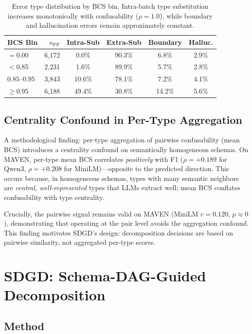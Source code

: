\documentclass[11pt,a4paper]{article}
\begin{document}
\begin{table}[t]
\centering
\small
\begin{tabular}{lrcccc}
\toprule
BCS Bin & $n_{\text{FP}}$ & Intra-Sub & Extra-Sub & Boundary & Halluc. \\
\midrule
$= 0.00$       & 6,172 &  0.0\% & 90.3\% & 6.8\% & 2.9\% \\
$< 0.85$       & 2,231 &  1.6\% & 89.9\% & 5.7\% & 2.8\% \\
$0.85$--$0.95$ & 3,843 & 10.6\% & 78.1\% & 7.2\% & 4.1\% \\
$\geq 0.95$    & 6,188 & 49.4\% & 30.8\% & 14.2\% & 5.6\% \\
\bottomrule
\end{tabular}
\caption{Error type distribution by BCS bin. Intra-batch type substitution increases monotonically with confusability ($\rho = 1.0$), while boundary and hallucination errors remain approximately constant.}
\label{tab:error-taxonomy}
\end{table}

\subsection{Centrality Confound in Per-Type Aggregation}

A methodological finding: per-type aggregation of pairwise confusability (mean BCS) introduces a centrality confound on semantically homogeneous schemas.
On MAVEN, per-type mean BCS correlates \emph{positively} with F1 ($\rho = +0.189$ for Qwen3, $\rho = +0.208$ for MiniLM)---opposite to the predicted direction. This occurs because, in homogeneous schemas, types with many semantic neighbors are \emph{central, well-represented} types that LLMs extract well; mean BCS conflates confusability with type centrality.

Crucially, the pairwise signal remains valid on MAVEN (MiniLM $r = 0.120$, $p \approx 0$), demonstrating that operating at the pair level avoids the aggregation confound.
This finding motivates SDGD's design: decomposition decisions are based on pairwise similarity, not aggregated per-type scores.


\section{SDGD: Schema-DAG-Guided Decomposition}
\label{sec:sdgd}

\subsection{Method}
\end{document}
